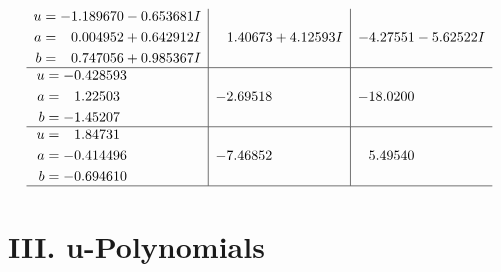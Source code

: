 \documentclass[1p]{elsarticle_modified}
\theoremstyle{definition}
\begin{document}
$$\begin{array}{c|c|c}
\begin{aligned}
u &= -1.189670 - 0.653681 I \\
a &= \phantom{-}0.004952 + 0.642912 I \\
b &= \phantom{-}0.747056 + 0.985367 I\end{aligned}
 & \phantom{-}1.40673 + 4.12593 I & -4.27551 - 5.62522 I \\ \hline\begin{aligned}
u &= -0.428593\phantom{ +0.000000I} \\
a &= \phantom{-}1.22503\phantom{ +0.000000I} \\
b &= -1.45207\phantom{ +0.000000I}\end{aligned}
 & -2.69518\phantom{ +0.000000I} & -18.0200\phantom{ +0.000000I} \\ \hline\begin{aligned}
u &= \phantom{-}1.84731\phantom{ +0.000000I} \\
a &= -0.414496\phantom{ +0.000000I} \\
b &= -0.694610\phantom{ +0.000000I}\end{aligned}
 & -7.46852\phantom{ +0.000000I} & \phantom{-}5.49540\phantom{ +0.000000I}\\
 \hline 
 \end{array}$$\newpage
\newpage\renewcommand{\arraystretch}{1}
\centering \section*{ III. u-Polynomials}
\end{document}
